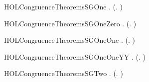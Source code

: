 \newcommand{\HOLCongruenceTheoremsSEQXXstrongind}{\UseVerbatim{HOLCongruenceTheoremsSEQXXstrongind}}
\begin{SaveVerbatim}{HOLCongruenceTheoremsSGOne}
\HOLTokenTurnstile{} \HOLSymConst{\HOLTokenForall{}}.  (\HOLTokenLambda{}. )
\end{SaveVerbatim}
\newcommand{\HOLCongruenceTheoremsSGOne}{\UseVerbatim{HOLCongruenceTheoremsSGOne}}
\begin{SaveVerbatim}{HOLCongruenceTheoremsSGOneZero}
\HOLTokenTurnstile{} \HOLSymConst{\HOLTokenForall{}} .  (\HOLTokenLambda{}. \HOLConst{\ensuremath{\tau}}  \HOLSymConst{\ensuremath{+}} \HOLConst{\ensuremath{\tau}} ) \HOLSymConst{\HOLTokenImp{}}   \HOLSymConst{\HOLTokenConj{}}  
\end{SaveVerbatim}
\newcommand{\HOLCongruenceTheoremsSGOneZero}{\UseVerbatim{HOLCongruenceTheoremsSGOneZero}}
\begin{SaveVerbatim}{HOLCongruenceTheoremsSGOneOne}
\HOLTokenTurnstile{} \HOLSymConst{\HOLTokenForall{}}  .  (\HOLTokenLambda{}. \HOLConst{\ensuremath{\tau}}  \HOLSymConst{\ensuremath{+}}   ) \HOLSymConst{\HOLTokenImp{}}  
\end{SaveVerbatim}
\newcommand{\HOLCongruenceTheoremsSGOneOne}{\UseVerbatim{HOLCongruenceTheoremsSGOneOne}}
\begin{SaveVerbatim}{HOLCongruenceTheoremsSGOneOneYY}
\HOLTokenTurnstile{} \HOLSymConst{\HOLTokenForall{}}  .  (\HOLTokenLambda{}.    \HOLSymConst{\ensuremath{+}} \HOLConst{\ensuremath{\tau}} ) \HOLSymConst{\HOLTokenImp{}}  
\end{SaveVerbatim}
\newcommand{\HOLCongruenceTheoremsSGOneOneYY}{\UseVerbatim{HOLCongruenceTheoremsSGOneOneYY}}
\begin{SaveVerbatim}{HOLCongruenceTheoremsSGTwo}
\HOLTokenTurnstile{} \HOLSymConst{\HOLTokenForall{}} .   \HOLSymConst{\HOLTokenImp{}}  (\HOLTokenLambda{}.   )
\end{SaveVerbatim}
